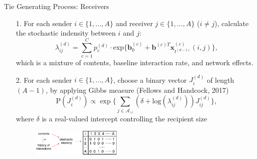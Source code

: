 \documentclass[10pt]{beamer}
\theoremstyle{definition}
\theoremstyle{remark}
\begin{document}
\begin{frame}{Tie Generating Process: Receivers}
		\begin{itemize}
		\item [1.] For each sender $i \in \{1,...,A\}$ and receiver $j \in \{1,...,A\}$ ($i \neq j$), calculate the stochastic indensity between $i$ and $j$:
			\begin{equation*}\lambda^{(d)}_{ij}=\sum\limits_{c=1}^{C} p^{(d)}_c
		\cdot  \mbox{exp}\Big\{\boldsymbol{b}^{(c)}_0 + \boldsymbol{b}^{(c)T}\boldsymbol{x}^{(c)}_{t^{(d-1)}}(i, j)\Big\},	\end{equation*}\normalsize
		which is a mixture of contents, baseline interaction rate, and network effects.\\ \vspace{0.4cm}
		\item[2.] For each sender $i \in \{1,...,A\}$, choose a binary vector $J^{(d)}_i$ of length $(A-1)$, by applying Gibbs measure (Fellows and Handcock, 2017) 
		\begin{equation*} \text{P}(J_i^{(d)}) \propto \exp\Big\{ \sum_{j \in \mathcal{A}_{\backslash i}} (\delta+\mbox{log}(\lambda_{ij}^{(d)}))J_{ij}^{(d)} \Big\},
		\end{equation*}
		\normalsize
		where $\delta$ is a real-valued intercept controlling the recipient size\\ \vspace{0.1cm}
 \begin{figure}
 	\includegraphics[width=0.4\textwidth]{figures/edge.pdf}
 \end{figure}	
	\end{itemize}
	\end{frame}
\end{document}
